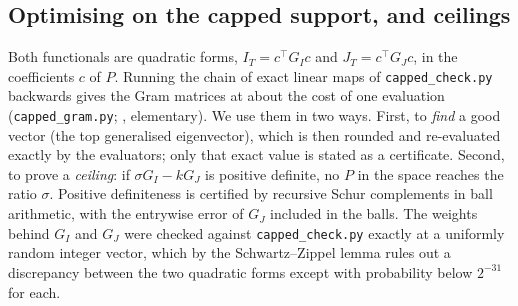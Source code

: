 \subsection*{Optimising on the capped support, and ceilings}
Both functionals are quadratic forms, $I_T=c^\top G_Ic$ and $J_T=c^\top G_Jc$,
in the coefficients $c$ of $P$. Running the chain of exact linear maps of
\texttt{capped\_check.py} backwards gives the Gram matrices at about the cost
of one evaluation (\texttt{capped\_gram.py}; , elementary).
We use them in two ways. First, to \emph{find} a good vector (the top
generalised eigenvector), which is then rounded and re-evaluated exactly by
the evaluators; only that exact value is stated as a certificate. Second, to
prove a \emph{ceiling}: if $\sigma G_I-kG_J$ is positive definite, no $P$ in
the space reaches the ratio $\sigma$. Positive definiteness is certified by
recursive Schur complements in ball arithmetic, with the entrywise error of
$G_J$ included in the balls. The weights behind $G_I$ and $G_J$ were checked
against \texttt{capped\_check.py} exactly at a uniformly random integer
vector, which by the Schwartz--Zippel lemma rules out a discrepancy between
the two quadratic forms except with probability below $2^{-31}$ for each.

